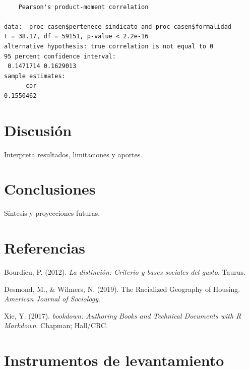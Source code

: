 \documentclass[
  a4paper,
  oneside]{scrbook}
\newlength{\cslhangindent}
\newenvironment{CSLReferences}[2] %
 {\begin{list}{}{%
  \setlength{\itemindent}{0pt}
  \setlength{\leftmargin}{0pt}
  \setlength{\parsep}{0pt}
  \ifodd #1
   \setlength{\leftmargin}{\cslhangindent}
   \setlength{\itemindent}{-1\cslhangindent}
  \fi
  \setlength{\itemsep}{#2\baselineskip}}}
 {\end{list}}
\begin{document}
\begin{verbatim}

    Pearson's product-moment correlation

data:  proc_casen$pertenece_sindicato and proc_casen$formalidad
t = 38.17, df = 59151, p-value < 2.2e-16
alternative hypothesis: true correlation is not equal to 0
95 percent confidence interval:
 0.1471714 0.1629013
sample estimates:
      cor 
0.1550462 
\end{verbatim}


\chapter{Discusión}\label{discusiuxf3n}

Interpreta resultados, limitaciones y aportes.


\chapter{Conclusiones}\label{conclusiones}

Síntesis y proyecciones futuras.


\chapter{Referencias}\label{referencias}

\label{refs}
\begin{CSLReferences}{1}{0}
Bourdieu, P. (2012). \emph{La distinci{ó}n: Criterio y bases sociales
del gusto}. Taurus.

Desmond, M., \& Wilmers, N. (2019). The Racialized Geography of Housing.
\emph{American Journal of Sociology}.

Xie, Y. (2017). \emph{bookdown: Authoring Books and Technical Documents
with R Markdown}. Chapman; Hall/CRC.

\end{CSLReferences}

\cleardoublepage
{}
{}
\appendix

\chapter{Instrumentos de
levantamiento}\label{instrumentos-de-levantamiento}
\end{document}
